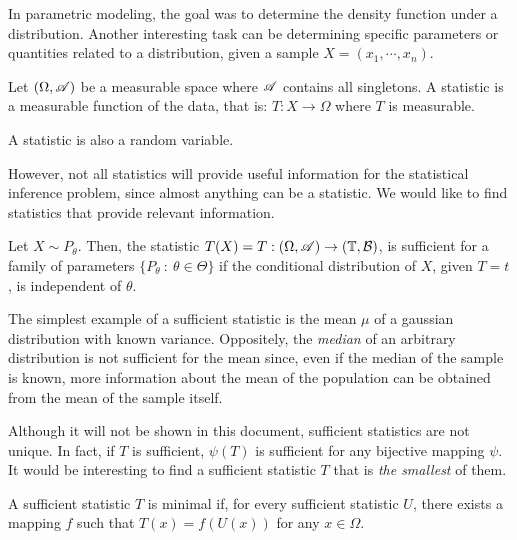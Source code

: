 In parametric modeling, the goal was to determine the density function under a distribution. Another interesting task can be determining specific parameters or quantities related to a distribution, given a sample $X = (x_1,\cdots,x_n)$.

\begin{ndef}
    Let $(\Omega,\mathscr{A})$ be a measurable space where $\mathscr{A}$ contains all singletons. A statistic is a measurable function of the data, that is: $T: X \to \Omega$ where $T$ is measurable.
\end{ndef}
\begin{remark}
    A statistic is also a random variable.
\end{remark}

However, not all statistics will provide useful information for the statistical inference problem, since almost anything can be a statistic. We would like to find statistics that provide relevant information.

\begin{ndef}
    Let $X \sim P_\theta$. Then, the statistic $T(X) = T : (\Omega, \mathscr{A}) \to (\mathbb T, \mathcal B)$, is sufficient for a family of parameters $\{P_\theta \ : \ \theta \in \Theta \}$ if the conditional distribution of $X$, given $T = t$, is independent of $\theta$.\\
\end{ndef}

\begin{nexample}
The simplest example of a sufficient statistic is the mean $\mu$ of a gaussian distribution with known variance. Oppositely, the \emph{median} of an arbitrary distribution
is not sufficient for the mean since, even if the median of the sample is known, more information about the mean of the population can be obtained from the mean of the sample itself.
\end{nexample}

Although it will not be shown in this document, sufficient statistics are not unique. In fact, if $T$ is sufficient, $\psi(T)$ is sufficient for any bijective mapping $\psi$. It would be interesting to find a sufficient statistic $T$ that is \emph{the smallest} of them.

\begin{ndef}
    A sufficient statistic $T$ is minimal if, for every sufficient statistic $U$, there exists a mapping $f$ such that $T(x) = f(U(x))$ for any $x \in \Omega$.
\end{ndef}
